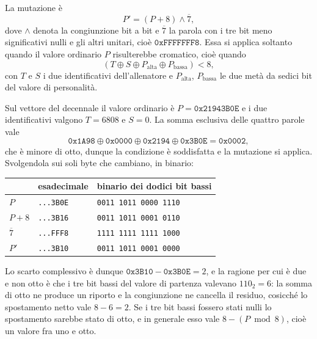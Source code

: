 La mutazione è
\begin{equation}
P' = (P + 8) \wedge \overline{7},
\end{equation}
dove $\wedge$ denota la congiunzione bit a bit e $\overline{7}$ la parola con i tre bit meno significativi nulli e gli altri unitari, cioè $\mathtt{0xFFFFFFF8}$. Essa si applica soltanto quando il valore ordinario $P$ risulterebbe cromatico, cioè quando
\begin{equation}
\left( T \oplus S \oplus P_{\mathrm{alta}} \oplus P_{\mathrm{bassa}} \right) < 8,
\end{equation}
con $T$ e $S$ i due identificativi dell'allenatore e $P_{\mathrm{alta}}$, $P_{\mathrm{bassa}}$ le due metà da sedici bit del valore di personalità.

Sul vettore del decennale il valore ordinario è $P = \mathtt{0x21943B0E}$ e i due identificativi valgono $T = 6808$ e $S = 0$. La somma esclusiva delle quattro parole vale
\begin{equation}
\mathtt{0x1A98} \oplus \mathtt{0x0000} \oplus \mathtt{0x2194} \oplus \mathtt{0x3B0E} = \mathtt{0x0002},
\end{equation}
che è minore di otto, dunque la condizione è soddisfatta e la mutazione si applica. Svolgendola sui soli byte che cambiano, in binario:
\begin{center}
\begin{tabular}{lll}
\toprule
& esadecimale & binario dei dodici bit bassi \\
\midrule
$P$        & \texttt{...3B0E} & \texttt{0011 1011 0000 1110} \\
$P + 8$    & \texttt{...3B16} & \texttt{0011 1011 0001 0110} \\
$\overline{7}$ & \texttt{...FFF8} & \texttt{1111 1111 1111 1000} \\
$P'$       & \texttt{...3B10} & \texttt{0011 1011 0001 0000} \\
\bottomrule
\end{tabular}
\end{center}

Lo scarto complessivo è dunque $\mathtt{0x3B10} - \mathtt{0x3B0E} = 2$, e la ragione per cui è due e non otto è che i tre bit bassi del valore di partenza valevano $110_2 = 6$: la somma di otto ne produce un riporto e la congiunzione ne cancella il residuo, cosicché lo spostamento netto vale $8 - 6 = 2$. Se i tre bit bassi fossero stati nulli lo spostamento sarebbe stato di otto, e in generale esso vale $8 - (P \bmod 8)$, cioè un valore fra uno e otto.

